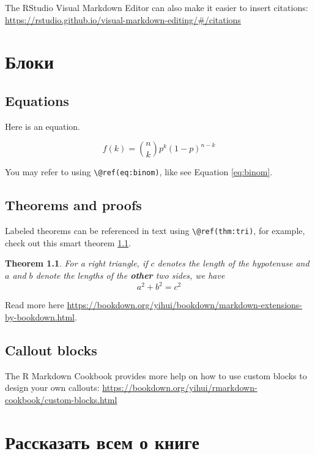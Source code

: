 \documentclass[
  12pt,
  a4paper,
]{book}
\newtheorem{theorem}{Theorem}[chapter]
\theoremstyle{definition}
\theoremstyle{definition}
\theoremstyle{definition}
\theoremstyle{definition}
\theoremstyle{remark}
\begin{document}
The RStudio Visual Markdown Editor can also make it easier to insert citations: \url{https://rstudio.github.io/visual-markdown-editing/\#/citations}

\chapter{Блоки}\label{blocks}

\section{Equations}\label{equations}

Here is an equation.

\begin{equation} 
  f\left(k\right) = \binom{n}{k} p^k\left(1-p\right)^{n-k}
  \label{eq:binom}
\end{equation}

You may refer to using \texttt{\textbackslash{}@ref(eq:binom)}, like see Equation \eqref{eq:binom}.

\section{Theorems and proofs}\label{theorems-and-proofs}

Labeled theorems can be referenced in text using \texttt{\textbackslash{}@ref(thm:tri)}, for example, check out this smart theorem \ref{thm:tri}.

\begin{theorem}
\protect\hypertarget{thm:tri}{}\label{thm:tri}For a right triangle, if \(c\) denotes the \emph{length} of the hypotenuse
and \(a\) and \(b\) denote the lengths of the \textbf{other} two sides, we have
\[a^2 + b^2 = c^2\]
\end{theorem}

Read more here \url{https://bookdown.org/yihui/bookdown/markdown-extensions-by-bookdown.html}.

\section{Callout blocks}\label{callout-blocks}

The R Markdown Cookbook provides more help on how to use custom blocks to design your own callouts: \url{https://bookdown.org/yihui/rmarkdown-cookbook/custom-blocks.html}

\chapter{Рассказать всем о книге}\label{share}
\end{document}
